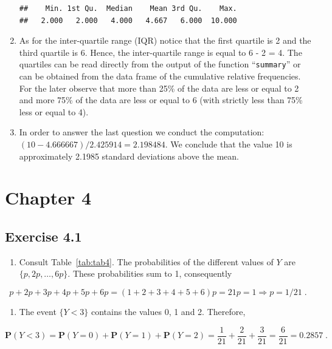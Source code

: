 \documentclass[
]{krantz}
\providecommand{\tightlist}{%
  \setlength{\itemsep}{0pt}\setlength{\parskip}{0pt}}
\newcommand{\Prob}{\mathbf{P}}
\theoremstyle{definition}
\theoremstyle{definition}
\theoremstyle{definition}
\theoremstyle{remark}
\begin{document}
\begin{enumerate}
\begin{verbatim}
##    Min. 1st Qu.  Median    Mean 3rd Qu.    Max. 
##   2.000   2.000   4.000   4.667   6.000  10.000
\end{verbatim}
\item
  As for the inter-quartile
  range (IQR) notice that the first quartile is 2 and the third quartile
  is 6. Hence, the inter-quartile range is equal to 6 - 2 = 4. The
  quartiles can be read directly from the output of the function
  ``\texttt{summary}'' or can be obtained from the data frame of the cumulative
  relative frequencies. For the later observe that more than 25\% of the
  data are less or equal to 2 and more 75\% of the data are less or equal
  to 6 (with strictly less than 75\% less or equal to 4).
\item
  In order to answer the last
  question we conduct the computation:
  \((10 - 4.666667)/2.425914 = 2.198484\). We conclude that the value 10 is
  approximately 2.1985 standard deviations above the mean.
\end{enumerate}

\hypertarget{chapter-4}{%
\section*{Chapter 4}\label{chapter-4}}


\hypertarget{exercise-4.1}{%
\subsection*{Exercise 4.1}\label{exercise-4.1}}


\begin{enumerate}
\def\labelenumi{\arabic{enumi}.}
\tightlist
\item
  Consult
  Table~\ref{tab:tab4}. The probabilities of the different values
  of \(Y\) are \(\{p, 2p, \ldots, 6p\}\). These probabilities sum to 1,
  consequently
\end{enumerate}

\[p + 2p + 3 p + 4 p + 5 p + 6p = (1+2+3+4+5+6)p = 21 p = 1 \Longrightarrow p = 1/21\;.\]

\begin{enumerate}
\def\labelenumi{\arabic{enumi}.}
\setcounter{enumi}{1}
\tightlist
\item
  The event \(\{Y < 3\}\) contains
  the values 0, 1 and 2. Therefore,
\end{enumerate}

\[\Prob(Y < 3) = \Prob(Y=0) + \Prob(Y=1) + \Prob(Y=2) = \frac{1}{21} + \frac{2}{21} + \frac{3}{21} = \frac{6}{21}= 0.2857\;.\]
\end{document}
